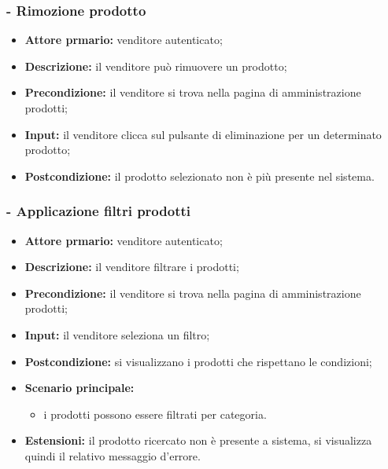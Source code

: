 \stepsubUserCase
\subsubsection{- Rimozione prodotto}
\begin{itemize}
    \item \textbf{Attore prmario:} venditore autenticato;
    \item \textbf{Descrizione:} il venditore può rimuovere un prodotto;
    \item \textbf{Precondizione:} il venditore si trova nella pagina di amministrazione prodotti;
    \item \textbf{Input:} il venditore clicca sul pulsante di eliminazione per un determinato prodotto;
    \item \textbf{Postcondizione:} il prodotto selezionato non è più presente nel sistema.
\end{itemize}

\stepsubUserCase
\subsubsection{- Applicazione filtri prodotti}
\begin{itemize}
    \item \textbf{Attore prmario:} venditore autenticato;
    \item \textbf{Descrizione:} il venditore filtrare i prodotti;
    \item \textbf{Precondizione:} il venditore si trova nella pagina di amministrazione prodotti;
    \item \textbf{Input:} il venditore seleziona un filtro;
    \item \textbf{Postcondizione:} si visualizzano i prodotti che rispettano le condizioni;
    \item \textbf{Scenario principale:}
    \begin{itemize}
        \item i prodotti possono essere filtrati per categoria.
    \end{itemize}
    \item \textbf{Estensioni:} il prodotto ricercato non è presente a sistema, si visualizza quindi il relativo messaggio d'errore.
\end{itemize}

\stepsubUserCase
